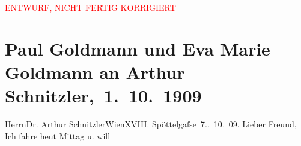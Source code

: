 
\begin{center}
            \textcolor{red}{ENTWURF, NICHT FERTIG KORRIGIERT}
                      \end{center}
            
         
         \renewcommand{\erwaehntePersonen}{Personen: Margarethe Fränkel, Paul Goldmann, Eva Marie Goldmann, Olga Schnitzler, Hans Tietze, Erica Tietze-Conrat}
         \renewcommand{\erwaehnteInstitutionen}{Institutionen: Hotel Sacher}
         \renewcommand{\erwaehnteOrte}{Orte: Armbrustergasse, Edmund-Weiß-Gasse 7, Hohe Warte, Hotel Sacher, Sternwartestraße 71, Wien}
         \renewcommand{\erwaehnteWerke}{}
               \section[ Paul Goldmann und Eva Marie Goldmann an Arthur Schnitzler, 1. 10. 1909]{ Paul Goldmann und Eva Marie Goldmann an Arthur
               Schnitzler, 1. 10. 1909}\nopagebreak{}\rehead{ }\begin{ledgroupsized}[t]{13cm}\normalsize\beginnumbering \toendnotes[C]{\smallbreak\pagebreak[2]} 
\toendnotes[C]{\smallbreak}\pstart{}{\pb}Herrn\pend{}\pstart{}Dr. Arthur Schnitzler\pend{}\pstart{}Wien\pend{}\pstart{}XVIII. Spöttelgaſse 7.\pend{}{\bigskip}. 10. 09.\pend
           \pstart
           Lieber Freund, Ich fahre heut{ }Mittag{ }\label{K_L03469-1v}\label{K_L03469-1h} u. will

\end{ledgroupsized}
